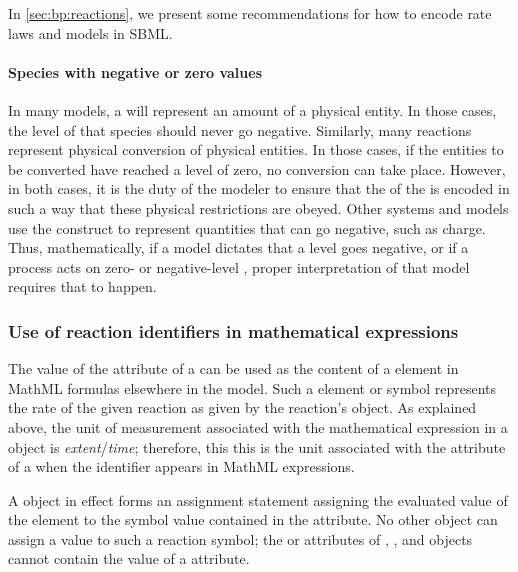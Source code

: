 In \ref{sec:bp:reactions}, we present some recommendations for
how to encode rate laws and models in SBML.

\paragraph{Species with negative or zero values}
\label{sec:neg-species}
In many models, a \Species will represent an amount of a physical entity.  In those cases, the level of that species should never go negative.  Similarly, many reactions represent physical conversion of physical entities.  In those cases, if the entities to be converted have reached a level of zero, no conversion can take place.  However, in both cases, it is the duty of the modeler to ensure that the \KineticLaw of the \Reaction is encoded in such a way that these physical restrictions are obeyed.  Other systems and models use the \Species construct to represent quantities that can go negative, such as charge.  Thus, mathematically, if a model dictates that a \Species level goes negative, or if a \Reaction process acts on zero- or negative-level \Species, proper interpretation of that model requires that to happen.


\subsubsection{Use of reaction identifiers in mathematical expressions}
\label{subsec:reaction-as-symbol}

The value of the  attribute of a \Reaction can be used
as the content of a  element in MathML formulas
elsewhere in the model.  Such a  element or symbol
represents the rate of the given reaction as given by the
reaction's \KineticLaw object.  As explained above, the unit of
measurement associated with the mathematical expression in a
\KineticLaw object is \emph{extent}/\emph{time}; therefore, this
this is the unit associated with the  attribute of a
\Reaction when the identifier appears in MathML expressions.

A \KineticLaw object in effect forms an assignment statement
assigning the evaluated value of the  element to the
symbol value contained in the \Reaction {} attribute.  No
other object can assign a value to such a reaction symbol; \ie the
 or  attributes of \InitialAssignment, \RateRule,
\AssignmentRule and \EventAssignment objects cannot contain the
value of a \Reaction {} attribute.


